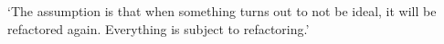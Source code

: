 \begin{savequote}[8cm]
	
	
	
	

	‘The assumption is that when something turns out to not be ideal, it will be refactored again. Everything is subject to refactoring.’
	
\end{savequote}

